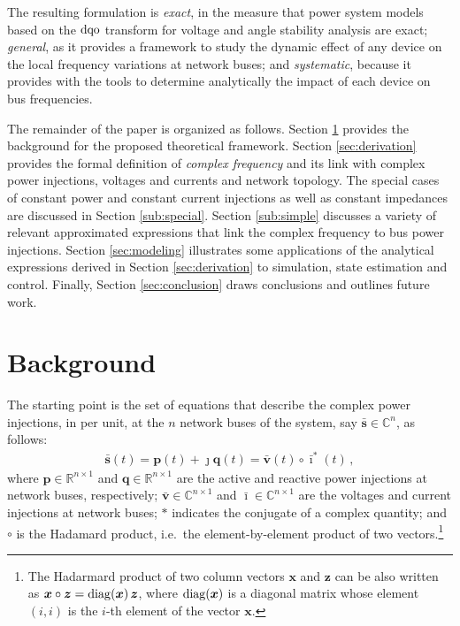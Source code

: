 \documentclass[journal, twocolumn, letter]{IEEEtran}
\newcommand{\bfg}[1]{\boldsymbol{#1}}
\newcommand{\bfp}[1]{\bar{\boldsymbol{#1}}}
\newcommand{\ii}{\imath}
\newcommand{\jj}{\jmath}
\newcommand{\ivec}{\bfp \ii}
\newcommand{\vvec}{\bfp v}
\newcommand{\svec}{\bar{\bfg s}}
\begin{document}
The resulting formulation is \textit{exact}, in the measure that power
system models based on the $\rm dqo$ transform for voltage and angle
stability analysis are exact;  \textit{general}, as it
provides a framework to study the dynamic effect of any device on the
local frequency variations at network buses; and \textit{systematic},
because it provides with the tools to determine analytically the
impact of each device on bus frequencies.

The remainder of the paper is organized as follows.  Section
\ref{sec:background} provides the background for the proposed
theoretical framework.  Section \ref{sec:derivation} provides the
formal definition of \textit{complex frequency} and its link with
complex power injections, voltages and currents and network topology.
The special cases of constant power and constant current injections as
well as constant impedances are discussed in Section
\ref{sub:special}.  Section \ref{sub:simple} discusses a variety of
relevant approximated expressions that link the complex frequency to
bus power injections.  Section \ref{sec:modeling} illustrates some
applications of the analytical expressions derived in Section
\ref{sec:derivation} to simulation, state estimation and control.
Finally, Section \ref{sec:conclusion} draws conclusions and outlines
future work.


\section{Background}
\label{sec:background}



The starting point is the set of equations that describe the complex
power injections, in per unit, at the $n$ network buses of the system,
say $\svec \in \mathbb{C}^n$, as follows:
\begin{equation}
  \label{eq:st}
  \begin{aligned}
    \svec(t) = \bfg p(t) + \jj \bfg q(t) =
    \bfp v(t) \circ \ivec^*(t) \, ,
  \end{aligned}
\end{equation}
where $\bfg p \in \mathbb{R}^{n \times 1}$ and
$\bfg q \in \mathbb{R}^{n \times 1}$ are the active and reactive power
injections at network buses, respectively;
$\vvec \in \mathbb{C}^{n \times 1}$ and
$\ivec \in \mathbb{C}^{n \times 1}$ are the voltages and current
injections at network buses; $*$ indicates the conjugate of a complex
quantity; and $\circ$ is the Hadamard product, i.e.~the
element-by-element product of two vectors.\footnote{The Hadarmard
  product of two column vectors $\bfg x$ and $\bfg z$ can be also
  written as $\bfg x \circ \bfg z = {\rm diag}(\bfg x) \, \bfg z$,
  where ${\rm diag}(\bfg x)$ is a diagonal matrix whose element
  $(i,i)$ is the $i$-th element of the vector $\bfg x$.}
\end{document}
